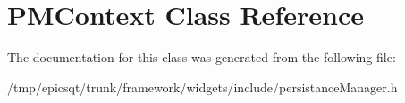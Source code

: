\hypertarget{classPMContext}{
\section{PMContext Class Reference}
\label{classPMContext}
}


The documentation for this class was generated from the following file:\begin{DoxyCompactItemize}
\item 
/tmp/epicsqt/trunk/framework/widgets/include/persistanceManager.h\end{DoxyCompactItemize}
